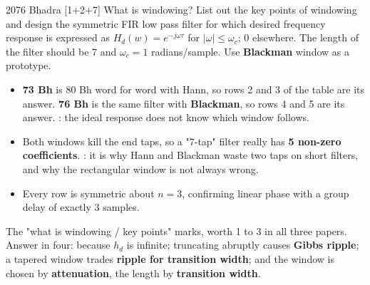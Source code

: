 \begin{asked}{2076 Bhadra \textperiodcentered{} [1+2+7]}
What is windowing? List out the key points of windowing and design the symmetric FIR low
pass filter for which desired frequency response is expressed as
$H_d(w)=e^{-j\omega\tau}$ for $|\omega|\le\omega_c$; $0$ elsewhere. The length of the
filter should be $7$ and $\omega_c=1$ radians/sample. Use \textbf{Blackman} window as a
prototype.
\end{asked}

\begin{itemize}
  \item \textbf{73 Bh} is 80 Bh word for word with Hann, so rows 2 and 3 of the table
        are its answer. \textbf{76 Bh} is the same filter with \textbf{Blackman}, so
        rows 4 and 5 are its answer. : the
        ideal response does not know which window follows.
  \item Both windows kill the end taps, so a "7-tap" filter really has \textbf{5
        non-zero coefficients}. : it is why Hann and Blackman waste
        two taps on short filters, and why the rectangular window is not always wrong.
  \item Every row is symmetric about $n=3$, confirming linear phase with a group delay
        of exactly 3 samples.
\end{itemize}

{\color{sub}\footnotesize The "what is windowing / key points" marks, worth 1 to 3 in all
three papers. Answer in four:  because $h_d$ is infinite;
truncating abruptly causes \textbf{Gibbs ripple}; a tapered window trades \textbf{ripple
for transition width}; and the window is chosen by \textbf{attenuation}, the length by
\textbf{transition width}.}

\hr

{\color{sub}\footnotesize {} }

